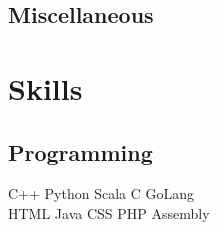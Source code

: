 \documentclass[]{cv-openfont}
\begin{document}
\begin{minipage}[t]{0.31\textwidth}
\subsection{Miscellaneous}


\section{Skills}
\subsection{Programming}
C++ \textbullet{}   Python \textbullet{} Scala \textbullet{} C \textbullet{} GoLang\\
HTML \textbullet{} Java \textbullet{} CSS \textbullet{} PHP \textbullet{} Assembly \\
\sectionsep

%
%

\end{minipage} 
\hfill
\end{document}
